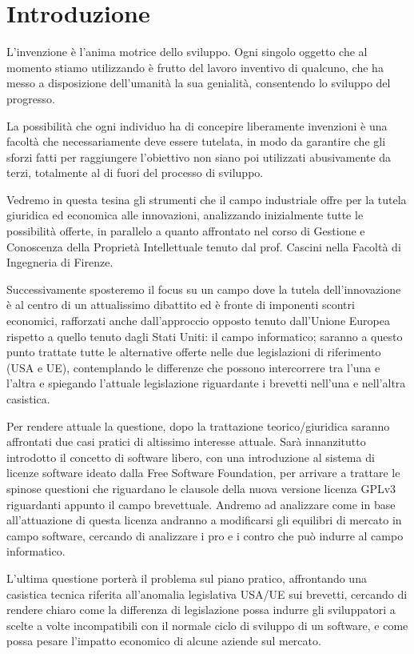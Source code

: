  \chapter{Introduzione}
L'invenzione è l'anima motrice dello sviluppo. Ogni singolo oggetto che al momento stiamo utilizzando è frutto del lavoro inventivo di qualcuno, che ha messo a disposizione dell'umanità la sua genialità, consentendo lo sviluppo del progresso. 

La possibilità che ogni individuo ha di concepire liberamente invenzioni è una facoltà che necessariamente deve essere tutelata, in modo da garantire che gli sforzi fatti per raggiungere l'obiettivo non siano poi utilizzati abusivamente da terzi, totalmente al di fuori del processo di sviluppo. 

Vedremo in questa tesina gli strumenti che il campo industriale offre per la tutela giuridica ed economica alle innovazioni, analizzando inizialmente tutte le possibilità offerte, in parallelo a quanto affrontato nel corso di Gestione e Conoscenza della Proprietà Intellettuale tenuto dal prof. Cascini nella Facoltà di Ingegneria di Firenze. 

Successivamente sposteremo il focus su un campo dove la tutela dell'innovazione è al centro di un attualissimo dibattito ed è fronte di imponenti scontri economici, rafforzati anche dall'approccio opposto tenuto dall'Unione Europea rispetto a quello tenuto dagli Stati Uniti: il campo informatico;  saranno a questo punto trattate tutte le alternative offerte nelle due legislazioni di riferimento (USA e UE), contemplando le differenze che possono intercorrere tra l'una e l'altra e spiegando l'attuale legislazione riguardante i brevetti nell'una e nell'altra casistica.

Per rendere attuale la questione, dopo la trattazione teorico/giuridica saranno affrontati due casi pratici di altissimo interesse attuale. Sarà innanzitutto introdotto il concetto di software libero, con una introduzione al sistema di licenze software ideato dalla Free Software Foundation, per arrivare a trattare le spinose questioni che riguardano le clausole della nuova versione licenza GPLv3\cite{gpl} riguardanti appunto il campo brevettuale. Andremo ad analizzare come in base all'attuazione di questa licenza andranno a modificarsi gli equilibri di mercato in campo software, cercando di analizzare i pro e i contro che può indurre al campo informatico.

L'ultima questione porterà il problema sul piano pratico, affrontando una casistica tecnica riferita all'anomalia legislativa USA/UE sui brevetti, cercando di rendere chiaro come la differenza di legislazione possa indurre gli sviluppatori a scelte a volte incompatibili con il normale ciclo di sviluppo di un software, e come possa pesare l'impatto economico di alcune aziende sul mercato.
